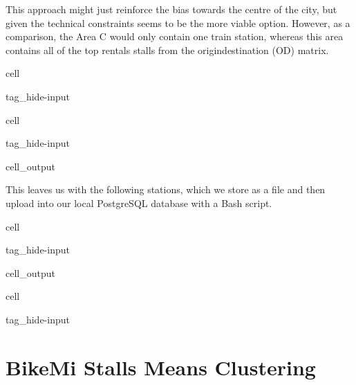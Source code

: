 \documentclass[letterpaper,10pt,english]{jupyterBook}
\begin{document}
\sphinxAtStartPar
This approach might just reinforce the bias towards the centre of the city, but given the technical constraints seems to be the more viable option. However, as a comparison, the Area C would only contain one train station, whereas this area contains all of the top rentals stalls from the origin\sphinxhyphen{}destination (OD) matrix.

\begin{sphinxuseclass}{cell}
\begin{sphinxuseclass}{tag_hide-input}
\end{sphinxuseclass}
\end{sphinxuseclass}
\begin{sphinxuseclass}{cell}
\begin{sphinxuseclass}{tag_hide-input}
\begin{sphinxuseclass}{cell_output}
\noindent{}

\end{sphinxuseclass}
\end{sphinxuseclass}
\end{sphinxuseclass}
\sphinxAtStartPar
This leaves us with the following stations, which we store as a  file and then upload into our local PostgreSQL database with a Bash script.

\begin{sphinxuseclass}{cell}
\begin{sphinxuseclass}{tag_hide-input}
\begin{sphinxuseclass}{cell_output}
\noindent{}

\end{sphinxuseclass}
\end{sphinxuseclass}
\end{sphinxuseclass}
\begin{sphinxuseclass}{cell}
\begin{sphinxuseclass}{tag_hide-input}
\end{sphinxuseclass}
\end{sphinxuseclass}

\chapter{BikeMi Stalls \sphinxhyphen{}Means Clustering}
\label{\detokenize{04-stations_kmeans:bikemi-stalls-k-means-clustering}}\label{\detokenize{04-stations_kmeans::doc}}
\end{document}
